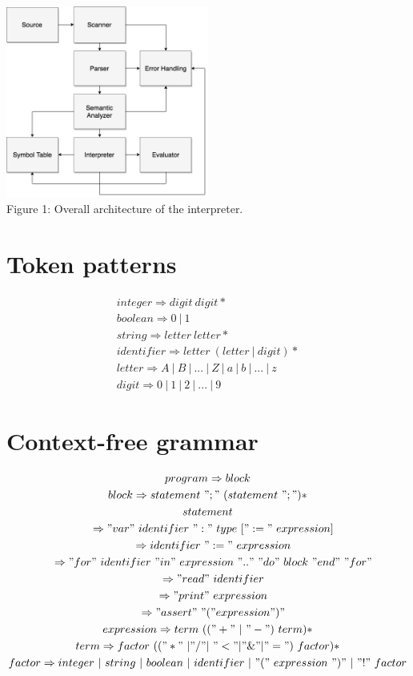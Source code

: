 \documentclass[fleqn]{article}
\begin{document}
{\centering
    \vspace*{1cm} 
    \includegraphics[width=0.5\textwidth]{architecture}
    \\Figure 1: Overall architecture of the interpreter.
    \par
}
 
\newpage
\section{Token patterns}

\begin{gather*}
    integer \Rightarrow digit \ digit* \\
    boolean \Rightarrow 0 \ | \ 1 \\
    string \Rightarrow letter \ letter* \\    
    identifier \Rightarrow letter \ (letter \ | \ digit)* \\
    letter \Rightarrow  A \ | \ B \ | \ . . . \ | \ Z \ | \ a \ | \ b \ | \ . . . \ | \ z \\
    digit \Rightarrow  0 \ | \ 1 \ | \ 2 \ | \ . . . \ | \ 9
\end{gather*}

\section{Context-free grammar}
\begin{gather*}
    program \Rightarrow block \\
    block \Rightarrow statement \ ";" \ (statement \ ";")* \\
    statement \\
    \quad \Rightarrow "var" \ identifier \ ":" \ type \ [ ":=" expression ] \\
    \quad \Rightarrow identifier \ ":=" \ expression \\
    \quad \Rightarrow "for" \ identifier \ "in"  expression \ ".." \ "do" \ block \ "end" \ "for" \\
    \quad \Rightarrow "read" \ identifier \\
    \quad \Rightarrow "print" \ expression \\
    \quad \Rightarrow "assert" \ "(" expression ")" \\
    expression \Rightarrow term \ (("+" \ | \ "-") \ term)* \\
    term \Rightarrow factor \ (("*" \ | "/" | "<" | "\&" | "=") \ factor)*  \\
    factor \Rightarrow integer \ | \ string \ | \ boolean \ | \ identifier \ | "(" \ expression \ ")" \ | \ "!" factor
\end{gather*}
\end{document}
